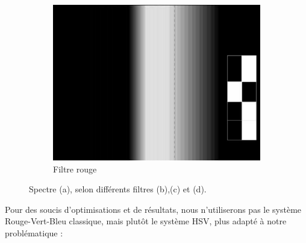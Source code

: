 \begin{itemize}
\begin{figure}[H]
					    \begin{subfigure}[h]{0.3\textwidth}
					        \includegraphics[width=\textwidth]{Graphics/opencvR.jpg}
					        \caption{Filtre rouge}
					    \end{subfigure}

					    \caption{Spectre (a), selon différents filtres (b),(c) et (d).}
					\end{figure}

					Pour des soucis d'optimisations et de résultats, nous n'utiliserons pas le système Rouge-Vert-Bleu classique, mais plutôt le système HSV\label{HSV}, plus adapté à notre problématique :


\end{itemize}
